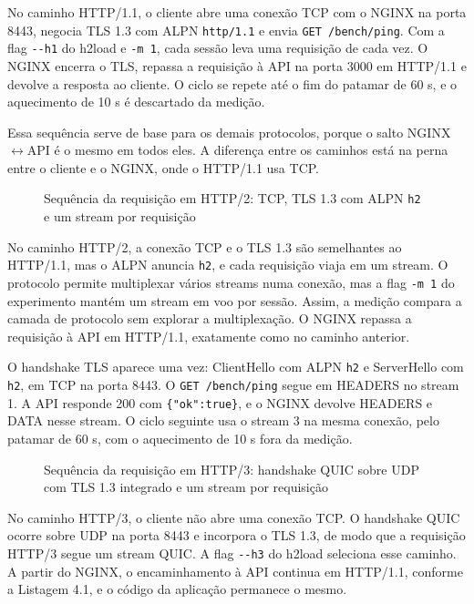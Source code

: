 No caminho HTTP/1.1, o cliente abre uma conexão TCP com o NGINX na porta 8443, negocia TLS 1.3 com ALPN \texttt{http/1.1} e envia \texttt{GET /bench/ping}. Com a flag \texttt{-{}-h1} do h2load e \texttt{-m 1}, cada sessão leva uma requisição de cada vez. O NGINX encerra o TLS, repassa a requisição à API na porta 3000 em HTTP/1.1 e devolve a resposta ao cliente. O ciclo se repete até o fim do patamar de 60 s, e o aquecimento de 10 s é descartado da medição.

Essa sequência serve de base para os demais protocolos, porque o salto NGINX$\leftrightarrow$API é o mesmo em todos eles. A diferença entre os caminhos está na perna entre o cliente e o NGINX, onde o HTTP/1.1 usa TCP.

\begin{figure}[H]
\centering

\caption{Sequência da requisição em HTTP/2: TCP, TLS 1.3 com ALPN \texttt{h2} e um stream por requisição}\label{fig:seq-http2}
\end{figure}

No caminho HTTP/2, a conexão TCP e o TLS 1.3 são semelhantes ao HTTP/1.1, mas o ALPN anuncia \texttt{h2}, e cada requisição viaja em um stream. O protocolo permite multiplexar vários streams numa conexão, mas a flag \texttt{-m 1} do experimento mantém um stream em voo por sessão. Assim, a medição compara a camada de protocolo sem explorar a multiplexação. O NGINX repassa a requisição à API em HTTP/1.1, exatamente como no caminho anterior.

O handshake TLS aparece uma vez: ClientHello com ALPN \texttt{h2} e ServerHello com \texttt{h2}, em TCP na porta 8443. O \texttt{GET /bench/ping} segue em HEADERS no stream 1. A API responde 200 com \texttt{\{"ok":true\}}, e o NGINX devolve HEADERS e DATA nesse stream. O ciclo seguinte usa o stream 3 na mesma conexão, pelo patamar de 60 s, com o aquecimento de 10 s fora da medição.

\begin{figure}[H]
\centering

\caption{Sequência da requisição em HTTP/3: handshake QUIC sobre UDP com TLS 1.3 integrado e um stream por requisição}\label{fig:seq-http3}
\end{figure}

No caminho HTTP/3, o cliente não abre uma conexão TCP. O handshake QUIC ocorre sobre UDP na porta 8443 e incorpora o TLS 1.3, de modo que a requisição HTTP/3 segue um stream QUIC. A flag \texttt{-{}-h3} do h2load seleciona esse caminho. A partir do NGINX, o encaminhamento à API continua em HTTP/1.1, conforme a Listagem 4.1, e o código da aplicação permanece o mesmo.

